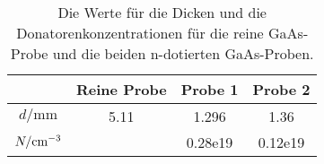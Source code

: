 \begin{table} \caption{Die Werte für die Dicken und die Donatorenkonzentrationen für die reine GaAs-Probe und die beiden n-dotierten GaAs-Proben.}
    \label{tab:proben}
    \centering
    \begin{tabular}{S[] S[] S[] S[]}
        \toprule
        {} & {Reine Probe} & {Probe 1} & {Probe 2} \\
        \midrule
         $d / \si{\milli\meter}$ & 5.11 & 1.296 & 1.36 \\
         $N / \si[per-mode=reciprocal]{\per\cubic\centi\meter}$ &  & 0.28e19 & 0.12e19 \\
        \bottomrule
    \end{tabular}
\end{table}